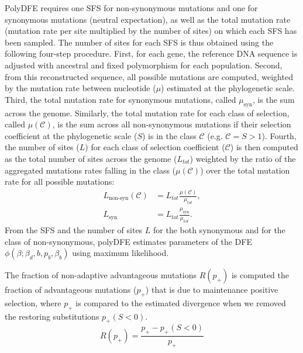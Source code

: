 \documentclass{article}
\newcommand{\Sphy}{S}
\newcommand{\Sphyclass}{\mathcal{C}}
\newcommand{\divAdv}{ \Sphy > 1}
\newcommand{\Spop}{\beta}
\begin{document}
    PolyDFE requires one SFS for non-synonymous mutations and one for synonymous mutations (neutral expectation), as well as the total mutation rate (mutation rate per site multiplied by the number of sites) on which each SFS has been sampled.
    The number of sites for each SFS is thus obtained using the following four-step procedure.
    First, for each gene, the reference DNA sequence is adjusted with ancestral and fixed polymorphism for each population.
    Second, from this reconstructed sequence, all possible mutations are computed, weighted by the mutation rate between nucleotide ($\mu$) estimated at the phylogenetic scale.
    Third, the total mutation rate for synonymous mutations, called $\mu_{\textrm{syn}}$, is the sum across the genome.
    Similarly, the total mutation rate for each class of selection, called  $\mu\left( \Sphyclass \right)$, is the sum across all non-synonymous mutations if their selection coefficient at the phylogenetic scale ($\Sphy$) is in the class $\Sphyclass$ (e.g. $\Sphyclass = \divAdv$).
    Fourth, the number of sites ($L$) for each class of selection coefficient ($\Sphyclass$) is then computed as the total number of sites across the genome ($L_{tot}$) weighted by the ratio of the aggregated mutations rates falling in the class ($\mu\left( \Sphyclass \right)$) over the total mutation rate for all possible mutations:
    \begin{align}
        L_{\textrm{non-syn}} \left( \Sphyclass \right) &= L_{tot} \frac{\mu\left( \Sphyclass \right)}{\mu_{tot}}, \\
        L_{\textrm{syn}} &= L_{tot} \frac{\mu_{\textrm{syn}}}{\mu_{tot}}.
    \end{align}
    From the SFS and the number of sites $L$ for the both synonymous and for the class of non-synonymous, polyDFE estimates parameters of the DFE $\phi \left( \Spop; \Spop_d , b, p_b, \Spop_b \right)$ using maximum likelihood.

    The fraction of non-adaptive advantageous mutations $R(p_+)$ is computed the fraction of advantageous mutations ($p_+$) that is due to maintenance positive selection, where $p_+$ is compared to the estimated divergence when we removed the restoring substitutions $p_+(\Sphy < 0)$.
    \begin{equation}
        R(p_+)=\dfrac{p_+ - p_+(\Sphy < 0)}{p_+}
    \end{equation}
\end{document}
